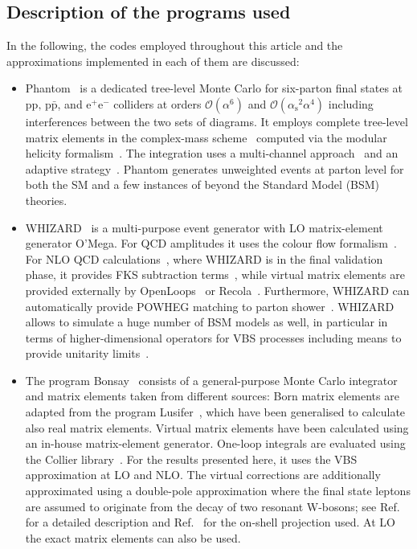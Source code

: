 \documentclass[twocolumn,epjc3]{svjour3} %
\newcommand{\Pp}{\ensuremath{\text{p}}\xspace}
\newcommand{\Pe}{\ensuremath{\text{e}}\xspace}
\newcommand{\alphas}{\ensuremath{\alpha_\text{s}}\xspace}
\begin{document}
    \subsection{Description of the programs used}
        \label{subsec:codedescr}
    In the following, the codes employed throughout this article and the approximations implemented in each of them are discussed:

    \begin{itemize}
      \item {\sc Phantom}~\cite{Ballestrero:2007xq} is a dedicated tree-level Monte Carlo for six-parton final states 
      at $\Pp \Pp,\, \Pp\bar{\Pp}$, and $\Pe^+\Pe^-$ colliders at orders $\mathcal O(\alpha^6)$ and $\mathcal O(\alphas^2\alpha^4)$ including interferences between the two sets of diagrams.
    It employs complete tree-level matrix elements in the complex-mass scheme~\cite{Denner:1999gp,Denner:2005fg,Denner:2006ic} computed via the modular helicity formalism~\cite{Ballestrero:1999md,Ballestrero:1994jn}.
    The integration uses a multi-channel approach~\cite{Berends:1984gf} and an adaptive strategy~\cite{Lepage:1977sw}.
    {\sc Phantom} generates unweighted events at parton level for both the SM and a few instances of beyond the Standard Model (BSM) theories.

      \item WHIZARD~\cite{Kilian:2007gr,Moretti:2001zz} is a multi-purpose event generator with LO matrix-element generator O'Mega. 
      For QCD amplitudes it uses the colour flow formalism~\cite{Kilian:2012pz}.
      For NLO QCD calculations~\cite{Nejad:2016bci}, where WHIZARD is in the final validation phase, it provides FKS subtraction terms~\cite{Frixione:1995ms,Frixione:1997np}, while virtual matrix elements are provided externally by OpenLoops~\cite{Cascioli:2011va} or Recola~\cite{Actis:2012qn,Actis:2016mpe}.
      Furthermore, WHIZARD can automatically provide POWHEG matching to parton shower~\cite{Reuter:2016qbi}.
      WHIZARD allows to simulate a huge number of BSM models as well, in particular in terms of higher-dimensional operators for VBS processes including means to provide unitarity limits~\cite{Alboteanu:2008my,Kilian:2014zja}.
      
    \item The program {\sc Bonsay}~\cite{Dittmaier:2018zzz} consists of a general-purpose Monte Carlo integrator and matrix elements taken from different sources:
    Born matrix elements are adapted from the program {\sc Lusifer}~\cite{Dittmaier:2002ap}, which have been generalised to calculate also real matrix elements.
    Virtual matrix elements have been calculated using an in-house matrix-element generator.
    One-loop integrals are evaluated using the {\sc Collier} library~\cite{Denner:2014gla,Denner:2016kdg}.
    For the results presented here, it uses the VBS approximation at LO and NLO.
    The virtual corrections are additionally approximated using a double-pole approximation where the final state leptons are assumed to originate from the decay of two resonant W-bosons; see Ref.~\cite{Denner:2000bj} for a
detailed description and Ref.~\cite{Dittmaier:2015bfe} for the on-shell projection used.
    At LO the exact matrix elements can also be used.


\end{itemize}
\end{document}
